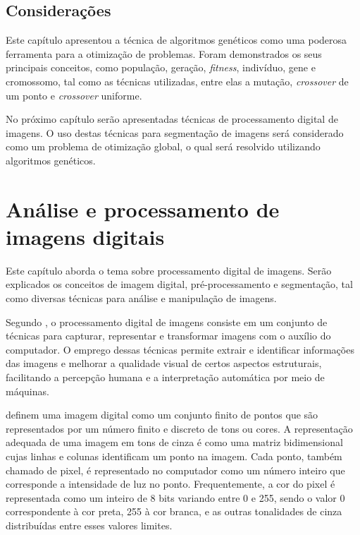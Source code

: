 \documentclass[12pt,oneside,a4paper,english,french,spanish,brazil,]{abntex2}
\begin{document}
\section{Considerações}

Este capítulo apresentou a técnica de algoritmos genéticos como uma poderosa ferramenta para a otimização de problemas. Foram demonstrados os seus principais conceitos, como população, geração, \textit{fitness}, indivíduo, gene e cromossomo, tal como as técnicas utilizadas, entre elas a mutação, \textit{crossover} de um ponto e \textit{crossover} uniforme.

No próximo capítulo serão apresentadas técnicas de processamento digital de imagens. O uso destas técnicas para segmentação de imagens será considerado como um problema de otimização global, o qual será resolvido utilizando algoritmos genéticos.


\chapter{Análise e processamento de imagens digitais}
\label{chap:PDI}

Este capítulo aborda o tema sobre processamento digital de imagens. Serão explicados os conceitos de imagem digital, pré-processamento e segmentação, tal como diversas técnicas para análise e manipulação de imagens.

Segundo \citet{pedrini:2008}, o processamento digital de imagens consiste em um conjunto de técnicas para capturar, representar e transformar imagens com o auxílio do computador. O emprego dessas técnicas permite extrair e identificar informações das imagens e melhorar a qualidade visual de certos aspectos estruturais, facilitando a percepção humana e a interpretação automática por meio de máquinas. 

\citet{conci:2003} definem uma imagem digital como um conjunto finito de pontos que são representados por um número finito e discreto de tons ou cores. A representação adequada de uma imagem em tons de cinza é como uma matriz bidimensional cujas linhas e colunas identificam um ponto na imagem. Cada ponto, também chamado de pixel, é representado no computador como um número inteiro que corresponde a intensidade de luz no ponto. Frequentemente, a cor do pixel é representada como um inteiro de 8 bits variando entre 0 e 255, sendo o valor 0 correspondente à cor preta, 255 à cor branca, e as outras tonalidades de cinza distribuídas entre esses valores limites.
\end{document}
